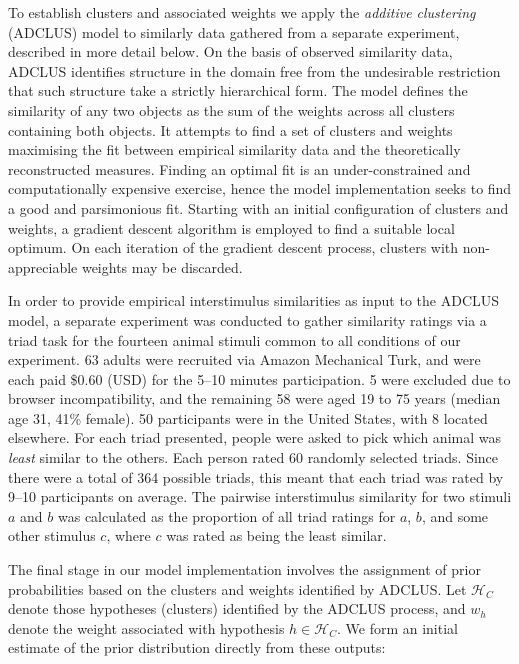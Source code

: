 \documentclass[doc,12pt]{apa}
\newcommand{\bigh}{\mathcal{H}}
\begin{document}
To establish clusters and associated weights we apply the {\em additive clustering} (ADCLUS) model \cite{SA79,Lee02,NG08} to similarly data gathered from a separate experiment, described in more detail below. On the basis of observed similarity data, ADCLUS identifies structure in the domain free from the undesirable restriction that such structure take a strictly hierarchical form.
The model defines the similarity of any two objects as the sum of the weights across all clusters containing both objects. It attempts to find a set of clusters and weights maximising the fit between empirical similarity data and the theoretically reconstructed measures. Finding an optimal fit is an under-constrained and computationally expensive exercise, hence the model implementation seeks to find a good and parsimonious fit. Starting with an initial configuration of clusters and weights, a gradient descent algorithm is employed to find a suitable local optimum. On each iteration of the gradient descent process, clusters with non-appreciable weights may be discarded.

In order to provide empirical interstimulus similarities as input to the ADCLUS model, a separate experiment was conducted to gather similarity ratings via a triad task for the fourteen animal stimuli common to all conditions of our experiment. 63 adults were recruited via Amazon Mechanical Turk, and were each paid \$0.60 (USD) for the 5--10 minutes participation. 5 were excluded due to browser incompatibility, and the remaining 58 were aged 19 to 75 years (median age 31, 41\% female). 50 participants were in the United States, with 8 located elsewhere. For each triad presented, people were asked to pick which animal was {\em least} similar to the others. Each person rated 60 randomly selected triads. Since there were a total of 364 possible triads, this meant that each triad was rated by 9--10 participants on average. The pairwise interstimulus similarity for two stimuli $a$ and $b$ was calculated as the proportion of all triad ratings for $a$, $b$, and some other stimulus $c$, where $c$ was rated as being the least similar.

The final stage in our model implementation involves the assignment of prior probabilities based on the clusters and weights identified by ADCLUS. Let $\bigh_C$ denote those hypotheses (clusters) identified by the ADCLUS process, and $w_h$ denote the weight associated with hypothesis $h \in \bigh_C$. We form an initial estimate of the prior distribution directly from these outputs:
\end{document}
